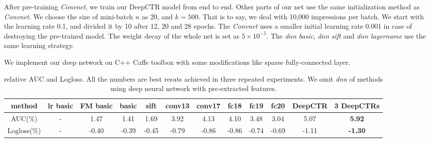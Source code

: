 \documentclass{sig-alternate}
\begin{document}
After pre-training  \emph{Convnet}, we train our DeepCTR model from end to end. Other parts of our net use the same  initialization method as  \emph{Convnet}. We choose the size of mini-batch $n$ as 20, and $k = 500$. That is to say, we deal with 10,000 impressions per batch.  We start with the learning rate 0.1, and divided it by 10 after 12, 20 and 28 epochs. The \emph{Convnet} uses a smaller initial learning rate 0.001 in case of destroying the pre-trained model. The weight decay of the whole net is set as $5\times 10^{-5}$. The \emph{dnn basic}, \emph{dnn sift} and \emph{dnn layername} use the same learning strategy. 

We implement our deep network on C++ Caffe toolbox \cite{jia2014caffe} with some modifications like sparse fully-connected layer.
\begin{table}
	\centering
	\caption{relative AUC and Logloss. All the numbers are   best resuts achieved in three repeated experiments. We omit \emph{dnn} of methods using deep neural network with pre-extracted features.}
	\label{table:AUC}
	\begin{tabular}{|c|c c c c|c c c c c|c c|} \hline
		method  & lr basic &FM basic &  basic &sift &conv13 &conv17 &fc18 &fc19 &fc20 &DeepCTR &3 DeepCTRs \\  \hline
		AUC(\%) & -        &  1.47 & 1.41  &1.69 &  3.92 &4.13   &4.10 &3.48 &3.04 &5.07    &\textbf{5.92} \\  \hline
		Logloss(\%)&-      &  -0.40 & -0.39 &-0.45& -0.79 & -0.86 &-0.86&-0.74&-0.69&-1.11   & \textbf{-1.30}\\ \hline
	\end{tabular}
\end{table}
\end{document}
